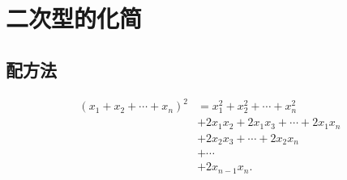 \documentclass[../../main.tex]{subfiles}
\begin{document}
\section{二次型的化简}

\subsection{配方法}

\begin{lemma}
\begin{align*}
(x_1 + x_2 + \cdots + x_n)^2&=x_1^2 + x_2^2 + \cdots + x_n^2\\
&+ 2x_1x_2 + 2x_1x_3 + \cdots + 2x_1x_n\\
&+ 2x_2x_3 + \cdots + 2x_2x_n\\
&+ \cdots\\
&+ 2x_{n - 1}x_n.
\end{align*} 
\end{lemma}

\vspace{1cm}
\end{document}
